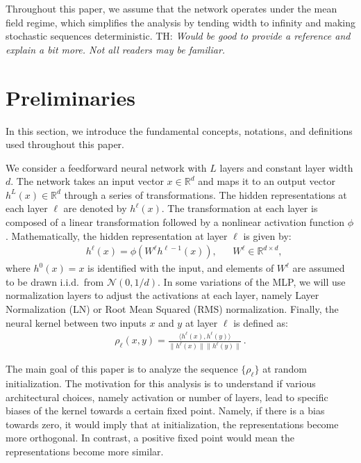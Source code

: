 \documentclass[twoside]{article}
\theoremstyle{definition}
\newcommand{\thomas}[1]{{\color{blue}TH:  \textit{#1}}}
\begin{document}
Throughout this paper, we assume that the network operates under the mean field regime, which simplifies the analysis by tending width to infinity and making stochastic sequences deterministic. \thomas{Would be good to provide a reference and explain a bit more. Not all readers may be familiar.}

\section{Preliminaries}
In this section, we introduce the fundamental concepts, notations, and definitions used throughout this paper. 

We consider a feedforward neural network with $L$ layers and constant layer width $d$. The network takes an input vector $x \in \mathbb{R}^d$ and maps it to an output vector $h^L(x) \in \mathbb{R}^d$ through a series of transformations. The hidden representations at each layer $\ell$ are denoted by $h^\ell(x)$. The transformation at each layer is composed of a linear transformation followed by a nonlinear activation function $\phi$. Mathematically, the hidden representation at layer $\ell$ is given by:
\begin{align}
& h^\ell(x) = \phi(W^\ell h^{\ell-1}(x)), && W^\ell \in \mathbb{R}^{d \times d},
\end{align}
where $h^0(x)=x$ is identified with the input, and elements of $W^\ell$ are assumed to be drawn i.i.d.~from $\mathcal N(0,1/d)$. In some variations of the MLP, we will use normalization layers to adjust the activations at each layer, namely Layer Normalization (LN) or Root Mean Squared (RMS) normalization. Finally, the neural kernel between two inputs $x$ and $y$ at layer $\ell$ is defined as:
\begin{align}
    \rho_\ell(x,y) = \frac{\langle h^\ell(x), h^\ell(y) \rangle}{\|h^\ell(x)\| \|h^\ell(y)\|}\,.
\end{align}

The main goal of this paper is to analyze the sequence $\{\rho_\ell\}$ at random initialization. The motivation for this analysis is to understand if various architectural choices, namely activation or number of layers, lead to specific biases of the kernel towards a certain fixed point. Namely, if there is a bias towards zero, it would imply that at initialization, the representations become more orthogonal. In contrast, a positive fixed point would mean the representations become more similar.
\end{document}
